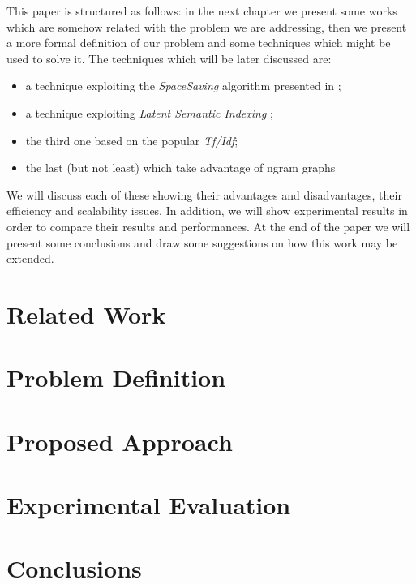 \documentclass{acm_proc_article-sp-sigmod07}
\begin{document}
This paper is structured as follows: in the next chapter we present some works
which are somehow related with the problem we are addressing, then we present a more
formal definition of our problem and some techniques which might be
used to solve it. The techniques which will be later discussed are:
\begin{itemize}
	\item a technique exploiting the \emph{SpaceSaving} algorithm presented in
		\cite{SS};
	\item a technique exploiting \emph{Latent Semantic Indexing} \cite{LSA};
	\item the third one based on the popular \emph{Tf/Idf};
	\item the last (but not least) which take advantage of ngram graphs
		\cite{Ngram}
\end{itemize}
We will discuss each of these showing their advantages and
disadvantages, their efficiency and scalability issues. In addition, we will
show experimental results in order to compare their results and performances.
At the end of the paper we will present
some conclusions and draw some suggestions on how this work may be extended.

\section{Related Work}


\section{Problem Definition}


\section{Proposed Approach}


\section{Experimental Evaluation}


\section{Conclusions}

\end{document}
